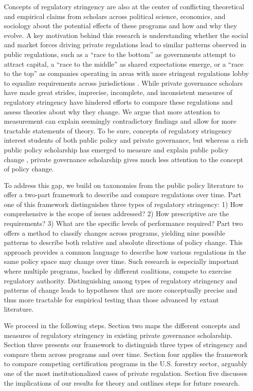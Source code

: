 \documentclass[
      12pt,
            Review ]{article}
\begin{document}
Concepts of regulatory stringency are also at the center of conflicting
theoretical and empirical claims from scholars across political science,
economics, and sociology about the potential effects of these programs
and how and why they evolve. A key motivation behind this research is
understanding whether the social and market forces driving private
regulations lead to similar patterns observed in public regulations,
such as a ``race to the bottom'' as governments attempt to attract
capital, a ``race to the middle'' as shared expectations emerge, or a
``race to the top'' as companies operating in areas with more stringent
regulations lobby to equalize requirements across jurisdictions
\citep{Berger1996, Rodrik2004, Vogel1995}. While private governance
scholars have made great strides, imprecise, incomplete, and
inconsistent measures of regulatory stringency have hindered efforts to
compare these regulations and assess theories about why they change. We
argue that more attention to measurement can explain seemingly
contradictory findings and allow for more tractable statements of
theory. To be sure, concepts of regulatory stringency interest students
of both public policy and private governance, but whereas a rich public
policy scholarship has emerged to measure and explain public policy
change \citep{Green-Pedersen2007, Hall1993, Howlett2014}, private
governance scholarship gives much less attention to the concept of
policy change.

To address this gap, we build on taxonomies from the public policy
literature to offer a two-part framework to describe and compare
regulations over time. Part one of this framework distinguishes three
types of regulatory stringency: 1) How comprehensive is the scope of
issues addressed? 2) How prescriptive are the requirements? 3) What are
the specific levels of performance required? Part two offers a method to
classify changes across programs, yielding nine possible patterns to
describe both relative and absolute directions of policy change. This
approach provides a common language to describe how various regulations
in the same policy space may change over time. Such research is
especially important where multiple programs, backed by different
coalitions, compete to exercise regulatory authority. Distinguishing
among types of regulatory stringency and patterns of change leads to
hypotheses that are more conceptually precise and thus more tractable
for empirical testing than those advanced by extant literature.

We proceed in the following steps. Section two maps the different
concepts and measures of regulatory stringency in existing private
governance scholarship. Section three presents our framework to
distinguish three types of stringency and compare them across programs
and over time. Section four applies the framework to compare competing
certification programs in the U.S. forestry sector, arguably one of the
most institutionalized cases of private regulation. Section five
discusses the implications of our results for theory and outlines steps
for future research.
\end{document}
